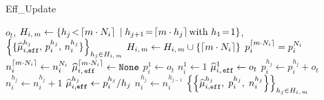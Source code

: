 \begin{minipage}{\textwidth}
\renewcommand*\footnoterule{}
\begin{savenotes}
\begin{algorithm}[H]
\caption{{\small\sc Eff\_Update}}
\begin{algorithmic}[1]
\label{alg:effupdate}
\Require $o_t$, \small $H_{i,\,m} \gets \left\{h_j \! <\! \left\lceil m \cdot N_i\right\rceil \; | \;  h_{j+1} \!=\! \left\lceil m \cdot h_j\right\rceil  \text{with } h_1 \!=\! 1\right\} $\normalsize, $\left\{ \{ \widehat{\mu}_{i,\texttt{eff}}^{h_j},\, p_i^{h_j}, \, n_i^{h_j} \}\right\}_{h_j \in H_{i,\,m}}$
\label{algline:effu-new-condition}   
\State $H_{i,\,m} \gets H_{i,\,m} \cup \left\{ \left\lceil m \cdot N_i\right\rceil \right\}$\label{algline:effu-new-h}
\State $p_i^{\left\lceil m \cdot N_i\right\rceil } = p_i^{N_i} $\label{algline:effu-new-p}
\State $n_i^{\left\lceil m \cdot N_i\right\rceil } \gets n_i^{N_i} $\label{algline:effu-new-n}
\State $\widehat{\mu}_{i, \, \texttt{eff}}^{\left\lceil m \cdot N_i\right\rceil }\leftarrow \texttt{None}$\label{algline:effu-new-mu}
\EndIf\label{algline:effu-new-end} 
\State $p_i^{1} \gets o_t$ \label{algline:effu-update-first-p} 
\State $n_i^{1} \gets 1$\label{algline:effu-update-first-n}
\State $\widehat{\mu}_{i, \, \texttt{eff}}^{1}\leftarrow o_t$ \label{algline:effu-update-first-hmu}
\label{algline:effu-update-start} 
\State $p_i^{h_j} \gets p_i^{h_j}  +o_t$\label{algline:effu-update-p}
\State $n_i^{h_j} \gets n_i^{h_j} + 1$\label{algline:effu-update-n}
\EndFor\label{algline:effu-update-end} 
\label{algline:effu-refresh-start}
 \label{algline:effu-refresh-condition}
\State $\widehat{\mu}_{i,\texttt{eff}}^{h_j} \leftarrow p_i^{h_j}/h_j$ \label{algline:effu-refresh-hmu}
 \label{algline:effu-refresh-p}
\State $n_i^{h_{j}} \gets n_i^{h_{j-1}} $\label{algline:effu-refresh-n}
\EndIf
\EndFor \label{algline:effu-refresh-end}
\Ensure $\left\{\left\{  \widehat{\mu}_{i,\texttt{eff}}^{h_j},\; p_i^{h_j}, \; n_i^{h_j} \right\}\right\}_{h_j \in H_{i,\,m}}$
\end{algorithmic}
\end{algorithm}
\end{savenotes}
\end{minipage}




